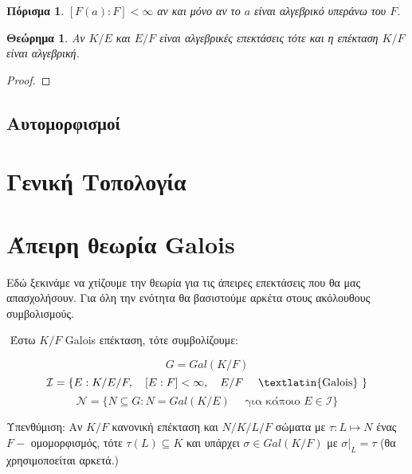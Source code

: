 \documentclass[oneside,a4paper]{article}
\newtheorem{theorem}{Θεώρημα}
\newtheorem{cor}{Πόρισμα}
\newcommand {\tl}{\textlatin}
\begin{document}
\begin{cor}  $[F(a): F] < \infty$ αν και μόνο αν το $a$ είναι αλγεβρικό υπεράνω του $F$.
\end{cor}


\begin{theorem}Αν $K/E$ και $E/F$ είναι αλγεβρικές επεκτάσεις τότε και η επέκταση $K/F$ είναι αλγεβρική.
\end{theorem}

\begin{proof}
\end{proof}

\subsection{Αυτομορφισμοί}


























\pagebreak
\section{Γενική Τοπολογία}
\pagebreak
\section{Άπειρη θεωρία \tl{Galois}}
\vspace{1cm}

Εδώ ξεκινάμε να χτίζουμε την θεωρία για τις άπειρες επεκτάσεις που θα μας απασχολήσουν. Για όλη την ενότητα θα βασιστούμε αρκέτα στους ακόλουθους συμβολισμούς.

$ $\newline
\noindent Έστω $K/F$ \tl{Galois} επέκταση, τότε συμβολίζουμε:

$$G=Gal(K/F)$$
$$\mathcal{I} = \{ E: K/E/F , \quad [E:F]<\infty , \quad E/F \quad\text{ \tl{Galois} } \}$$
$$\mathcal{N} = \{N \subseteq G: N = Gal(K/E) \quad\text{ για κάποιo } E \in \mathcal{I} \}$$

Υπενθύμιση: Aν $K/F$ κανονική επέκταση και $N/K/L/F$ σώματα με $\tau :L \mapsto N$ ένας $F-$ ομομορφισμός, τότε $\tau(L) \subseteq K$ και υπάρχει $\sigma \in Gal(K/F)$ με $\sigma|_L = \tau$ (θα χρησιμοποείται αρκετά.)
\end{document}
